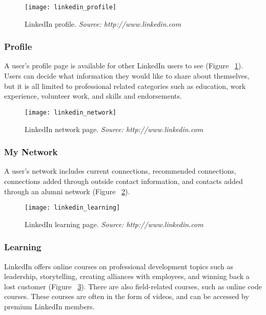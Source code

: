\begin{figure}[h]
\centering
\texttt{[image: linkedin\_profile]}
\caption{LinkedIn profile. \textit{Source: http://www.linkedin.com}}
\label{linkedin-profile}
\end{figure}

\subsubsection{Profile}

A user's profile page is available for other LinkedIn users to see (Figure ~\ref{linkedin-profile}). Users can decide what information they would like to share about themselves, but it is all limited to professional related categories such as education, work experience, volunteer work, and skills and endorsements. 

\begin{figure}[h]
\centering
\texttt{[image: linkedin\_network]}
\caption{LinkedIn network page. \textit{Source: http://www.linkedin.com}}
\label{linkedin-network}
\end{figure}

\subsubsection{My Network}

A user's network includes current connections, recommended connections, connections added through outside contact information, and contacts added through an alumni network (Figure ~\ref{linkedin-network}). 

\begin{figure}[h]
\centering
\texttt{[image: linkedin\_learning]}
\caption{LinkedIn learning page. \textit{Source: http://www.linkedin.com}}
\label{linkedin-learning}
\end{figure}

\subsubsection{Learning}

LinkedIn offers online courses on professional development topics such as leadership, storytelling, creating alliances with employees, and winning back a lost customer (Figure ~\ref{linkedin-learning}). There are also field-related courses, such as online code courses. These courses are often in the form of videos, and can be accessed by premium LinkedIn members. 

